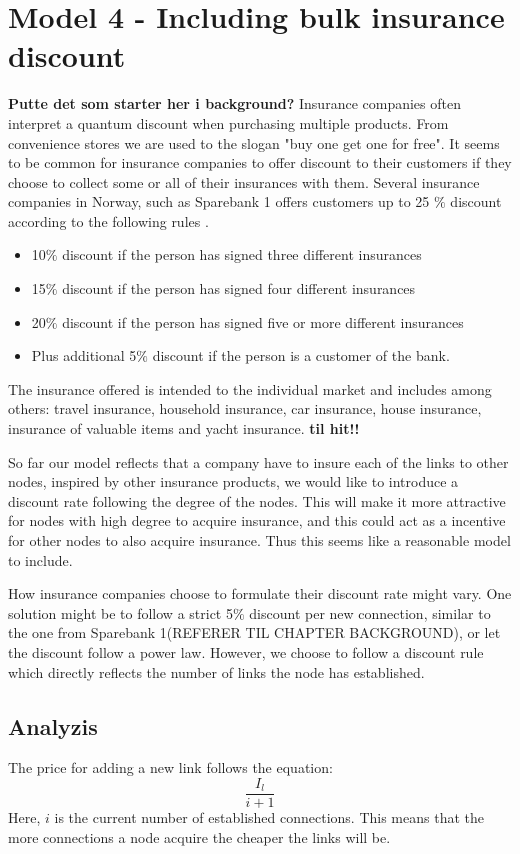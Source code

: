 \section{Model 4 - Including bulk insurance discount}
\textbf{Putte det som starter her i background?}
Insurance companies often interpret a quantum discount when purchasing multiple products. From convenience stores we are used to the slogan "buy one get one for free". It seems to be common for insurance companies to offer discount to their customers if they choose to collect some or all of their insurances with them. Several insurance companies in Norway, such as Sparebank 1 offers customers up to 25 $\%$ discount according to the following rules \cite{sparebank1}. 

\begin{itemize}

\item 10$\%$ discount if the person has signed three different insurances
\item 15$\%$ discount if the person has signed four different insurances
\item 20$\%$ discount if the person has signed five or more different insurances
\item Plus additional 5$\%$ discount if the person is a customer of the bank. 

\end{itemize}

The insurance offered is intended to the individual market and includes among others: travel insurance, household insurance, car insurance, house insurance, insurance of valuable items and yacht insurance.
\textbf{til hit!!}

So far our model reflects that a company have to insure each of the links to other nodes, inspired by other insurance products, we would like to introduce a discount rate following the degree of the nodes. This will make it more attractive for nodes with high degree to acquire insurance, and this could act as a incentive for other nodes to also acquire insurance. Thus this seems like a reasonable model to include.  

How insurance companies choose to formulate their discount rate might vary. One solution might be to follow a strict 5$\%$ discount per new connection, similar to the one from Sparebank 1(REFERER TIL CHAPTER BACKGROUND), or let the discount follow a power law. However, we choose to follow a discount rule which directly reflects the number of links the node has established. 
\subsection{Analyzis}
The price for adding a new link follows the equation:
\begin{equation}
\frac{I_{l}}{i+1}
\label{eq:discount0}
\end{equation}
Here, $i$ is the current number of established connections. This means that the more connections a node acquire the cheaper the links will be. 

